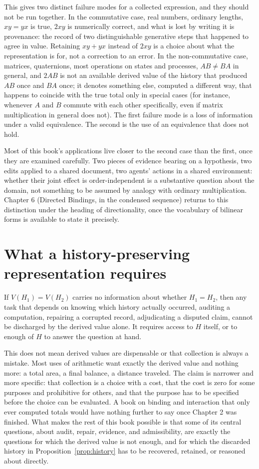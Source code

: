 \documentclass[11pt]{book}
\begin{document}
This gives two distinct failure modes for a collected expression, and they should not be run together. In the commutative case, real numbers, ordinary lengths, $xy=yx$ is true, $2xy$ is numerically correct, and what is lost by writing it is provenance: the record of two distinguishable generative steps that happened to agree in value. Retaining $xy+yx$ instead of $2xy$ is a choice about what the representation is for, not a correction to an error. In the non-commutative case, matrices, quaternions, most operations on states and processes, $AB \ne BA$ in general, and $2AB$ is not an available derived value of the history that produced $AB$ once and $BA$ once; it denotes something else, computed a different way, that happens to coincide with the true total only in special cases (for instance, whenever $A$ and $B$ commute with each other specifically, even if matrix multiplication in general does not). The first failure mode is a loss of information under a valid equivalence. The second is the use of an equivalence that does not hold.

Most of this book's applications live closer to the second case than the first, once they are examined carefully. Two pieces of evidence bearing on a hypothesis, two edits applied to a shared document, two agents' actions in a shared environment: whether their joint effect is order-independent is a substantive question about the domain, not something to be assumed by analogy with ordinary multiplication. Chapter 6 (Directed Bindings, in the condensed sequence) returns to this distinction under the heading of directionality, once the vocabulary of bilinear forms is available to state it precisely.

\section{What a history-preserving representation requires}

If $V(H_1)=V(H_2)$ carries no information about whether $H_1=H_2$, then any task that depends on knowing which history actually occurred, auditing a computation, repairing a corrupted record, adjudicating a disputed claim, cannot be discharged by the derived value alone. It requires access to $H$ itself, or to enough of $H$ to answer the question at hand.

This does not mean derived values are dispensable or that collection is always a mistake. Most uses of arithmetic want exactly the derived value and nothing more: a total area, a final balance, a distance traveled. The claim is narrower and more specific: that collection is a choice with a cost, that the cost is zero for some purposes and prohibitive for others, and that the purpose has to be specified before the choice can be evaluated. A book on binding and interaction that only ever computed totals would have nothing further to say once Chapter 2 was finished. What makes the rest of this book possible is that some of its central questions, about audit, repair, evidence, and admissibility, are exactly the questions for which the derived value is not enough, and for which the discarded history in Proposition~\ref{prop:history} has to be recovered, retained, or reasoned about directly.
\end{document}
